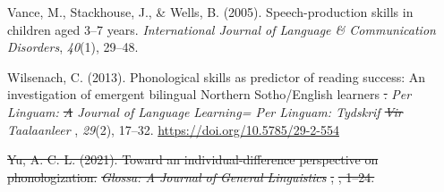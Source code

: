 \documentclass[english,,man,floatsintext]{apa6} %
\providecommand{\DIFaddtex}[1]{{\protect\color{blue}\uwave{#1}}} %
\providecommand{\DIFdeltex}[1]{{\protect\color{red}\sout{#1}}}                      %
\providecommand{\DIFaddbegin}{} %
\providecommand{\DIFaddend}{} %
\providecommand{\DIFdelbegin}{} %
\providecommand{\DIFdelend}{} %
\providecommand{\DIFadd}[1]{\texorpdfstring{\DIFaddtex{#1}}{#1}} %
\providecommand{\DIFdel}[1]{\texorpdfstring{\DIFdeltex{#1}}{}} %
\newcommand{\DIFscaledelfig}{0.5}
\newlength{\DIFdelgraphicswidth} %
\newlength{\DIFdelgraphicsheight} %
\newcommand{\DIFaddincludegraphics}[2][]{{\color{blue}\fbox{\DIFOincludegraphics[#1]{#2}}}} %
\newcommand{\DIFdelincludegraphics}[2][]{%
	\sbox{\DIFdelgraphicsbox}{\DIFOincludegraphics[#1]{#2}}%
	\settoboxwidth{\DIFdelgraphicswidth}{\DIFdelgraphicsbox} %
	\settoboxtotalheight{\DIFdelgraphicsheight}{\DIFdelgraphicsbox} %
	\scalebox{\DIFscaledelfig}{%
		\parbox[b]{\DIFdelgraphicswidth}{\usebox{\DIFdelgraphicsbox}\\[-\baselineskip] \rule{\DIFdelgraphicswidth}{0em}}\llap{\resizebox{\DIFdelgraphicswidth}{\DIFdelgraphicsheight}{%
				\setlength{\unitlength}{\DIFdelgraphicswidth}%
				\begin{picture}(1,1)%
				\thicklines\linethickness{2pt} %
				{\color[rgb]{1,0,0}\put(0,0){\framebox(1,1){}}}%
				{\color[rgb]{1,0,0}\put(0,0){\line( 1,1){1}}}%
				{\color[rgb]{1,0,0}\put(0,1){\line(1,-1){1}}}%
				\end{picture}%
			}\hspace*{3pt}}} %
} %
\DeclareRobustCommand{\DIFaddbegin}{\DIFOaddbegin \let\includegraphics\DIFaddincludegraphics} %
\DeclareRobustCommand{\DIFaddend}{\DIFOaddend \let\includegraphics\DIFOincludegraphics} %
\DeclareRobustCommand{\DIFdelbegin}{\DIFOdelbegin \let\includegraphics\DIFdelincludegraphics} %
\DeclareRobustCommand{\DIFdelend}{\DIFOaddend \let\includegraphics\DIFOincludegraphics} %
\begin{document}
\DIFdelend \hypertarget{ref-vance2005speech}{}%
Vance, M., Stackhouse, J., \& Wells, B. (2005). Speech-production skills in children aged 3--7 years. \emph{International Journal of Language \& Communication Disorders}, \emph{40}(1), 29--48.

\leavevmode\hypertarget{ref-wilsenach2013phonological}{}%
Wilsenach, C. (2013). \DIFdelbegin %
\DIFdelend Phonological skills as predictor of reading success: An investigation of emergent bilingual Northern Sotho/English learners\DIFdelbegin %
\DIFdel{. }\DIFdelend \DIFaddbegin \DIFadd{. }\DIFaddend \emph{\DIFdelbegin %
	\DIFdelend Per Linguam: \DIFdelbegin \DIFdel{A }\DIFdelend \DIFaddbegin \DIFadd{a }\DIFaddend Journal of Language Learning= Per Linguam: Tydskrif \DIFdelbegin \DIFdel{Vir }\DIFdelend \DIFaddbegin \DIFadd{vir }\DIFaddend Taalaanleer\DIFdelbegin %
	\DIFdelend }, \emph{29}(2), 17--32. \url{https://doi.org/10.5785/29-2-554}
\DIFdelbegin %

\DIFdel{Yu, A. C. L. (2021). Toward an individual-difference perspective on phonologization. }\emph{\DIFdel{Glossa: A Journal of General Linguistics}}%
\DIFdel{, }%
\DIFdel{, 1--24.
}%

\DIFdelend 
\end{document}
